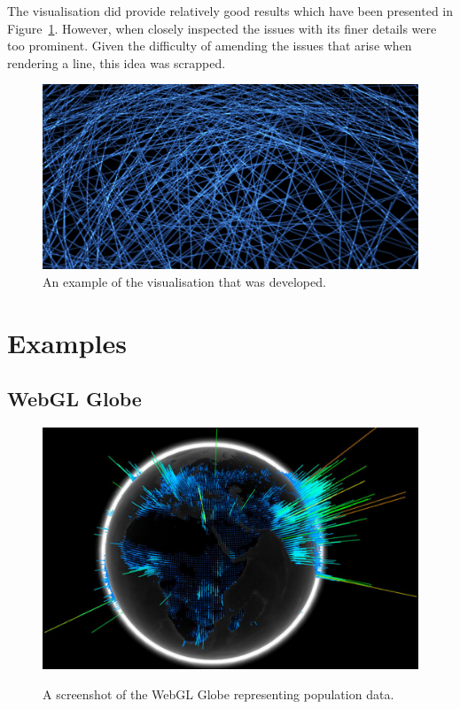 \documentclass[
	fontsize=11pt
	headlines=2,
	footlines=2,
	parskip=half
]{scrartcl}
\begin{document}
\begin{appendices}
{			The visualisation did provide relatively good results which have been presented in Figure~\ref{fig:proof_of_concept}. However, when closely inspected the issues with its finer details were too prominent. Given the difficulty of amending the issues that arise when rendering a line, this idea was scrapped.
			
			\begin{figure}[H]
        		\includegraphics[width=\textwidth]{images/proof-of-concept}
				\caption{An example of the visualisation that was developed.}
				\label{fig:proof_of_concept}
			\end{figure}
		
		}
		
		\newpage
	
		\section{Examples} {
		\label{app:examples}
		
			\subsection{WebGL Globe} {
			\label{app:globe}
		
				\begin{figure}[H]
        			\href{https://www.chromeexperiments.com/globe}{\includegraphics[width=\textwidth]{images/globe}}
					\caption{A screenshot of the WebGL Globe representing population data. \protect\footnotemark}
					\label{fig:webgl_globe}
				\end{figure}

}}
\end{appendices}
\end{document}
